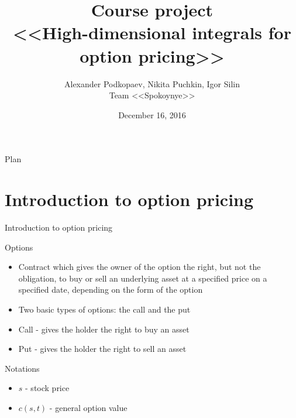 \documentclass{beamer}
\theoremstyle{definition}
\theoremstyle{plain}
\theoremstyle{remark}
\begin{document}
\setlength{\abovedisplayskip}{5pt}
\setlength{\belowdisplayskip}{5pt}

	\title[\hbox to 60mm{High-dimensional integrals \hfill\insertframenumber\,/\,10}]
			{ Course project \\ <<High-dimensional integrals for option pricing>>}
	\author[A. Podkopaev, N. Puchkin, I. Silin]{\large Alexander Podkopaev, Nikita Puchkin, Igor Silin \\Team <<Spokoynye>>}

\date{\footnotesize{December 16, 2016}}

	\begin{frame}
		\titlepage
	\end{frame}

	\begin{frame}{Plan}
		  \tableofcontents[
		    sectionstyle=show/show,
		    subsectionstyle=show/show/show
		  ]
	\end{frame}
	
	\section{Introduction to option pricing }
	\begin{frame}{Introduction to option pricing}	 
		\begin{block}{Options}
			\begin{itemize}
				\item Contract which gives the owner of the option the right, but not the obligation, to buy or sell an underlying asset at a specified price on a specified date, depending on the form of the option
				\item Two basic types of options: the call and the put
				\item Call -  gives the holder the right to buy an asset 
				\item Put - gives the holder the right to sell an asset
			\end{itemize}
		\end{block}
		\begin{block}{Notations}
			\begin{itemize}
				\item $s$ - stock price 
				\item $c(s,t)$ - general option value
			\end{itemize}
		\end{block}	 
	\end{frame}
\end{document}
